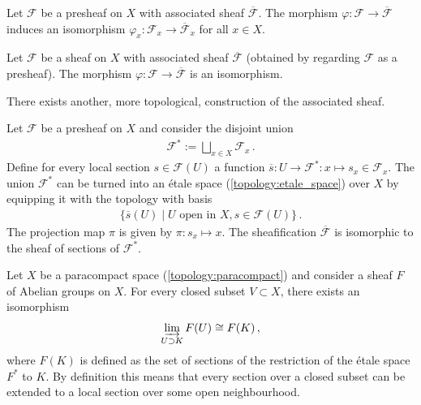     \begin{property}[Stalks]
        Let $\mathcal{F}$ be a presheaf on $X$ with associated sheaf $\overline{\mathcal{F}}$. The morphism $\varphi:\mathcal{F}\rightarrow\overline{\mathcal{F}}$ induces an isomorphism $\varphi_x:\mathcal{F}_x\rightarrow\overline{\mathcal{F}}_x$ for all $x\in X$.
    \end{property}
    \begin{property}
        Let $\mathcal{F}$ be a sheaf on $X$ with associated sheaf $\overline{\mathcal{F}}$ (obtained by regarding $\mathcal{F}$ as a presheaf). The morphism $\varphi:\mathcal{F}\rightarrow\overline{\mathcal{F}}$ is an isomorphism.
    \end{property}

    There exists another, more topological, construction of the associated sheaf.
    \begin{construct}\label{sheaf:etale_construction}
        Let $\mathcal{F}$ be a presheaf on $X$ and consider the disjoint union
        \begin{gather}
            \mathcal{F}^* := \bigsqcup_{x\in X}\mathcal{F}_x\,.
        \end{gather}
        Define for every local section $s\in\mathcal{F}(U)$ a function $\overline{s}:U\rightarrow\mathcal{F}^*:x\mapsto s_x\in\mathcal{F}_x$. The union $\mathcal{F}^*$ can be turned into an \'etale space (\cref{topology:etale_space}) over $X$ by equipping it with the topology with basis
        \begin{gather}
            \bigl\{\overline{s}(U)\mid U\text{ open in }X, s\in\mathcal{F}(U)\bigr\}\,.
        \end{gather}
        The projection map $\pi$ is given by $\pi:s_x\mapsto x$. The sheafification $\overline{\mathcal{F}}$ is isomorphic to the sheaf of sections of $\mathcal{F}^*$.
    \end{construct}

    \begin{property}
        Let $X$ be a paracompact space (\cref{topology:paracompact}) and consider a sheaf $F$ of Abelian groups on $X$. For every closed subset $V\subset X$, there exists an isomorphism
        \begin{gather}
            \varinjlim_{U\supset K}F(U)\cong F(K)\,,
        \end{gather}
        where $F(K)$ is defined as the set of sections of the restriction of the \'etale space $F^*$ to $K$. By definition this means that every section over a closed subset can be extended to a local section over some open neighbourhood.
    \end{property}

